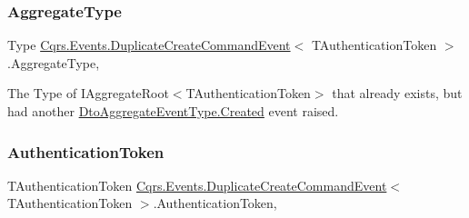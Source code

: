 \mbox{\label{classCqrs_1_1Events_1_1DuplicateCreateCommandEvent_ab08eddd7b1f812bdd62103017fd64f7e_ab08eddd7b1f812bdd62103017fd64f7e}} 
\subsubsection{\texorpdfstring{Aggregate\+Type}{AggregateType}}
{\footnotesize\ttfamily Type \hyperlink{classCqrs_1_1Events_1_1DuplicateCreateCommandEvent}{Cqrs.\+Events.\+Duplicate\+Create\+Command\+Event}$<$ T\+Authentication\+Token $>$.Aggregate\+Type\hspace{0.3cm}{\ttfamily [get]}, {\ttfamily [set]}}



The Type of I\+Aggregate\+Root$<$\+T\+Authentication\+Token$>$ that already exists, but had another \hyperlink{namespaceCqrs_1_1Events_a2a32e13adeac92f5a93966cd8ee2d39a_a2a32e13adeac92f5a93966cd8ee2d39aa0eceeb45861f9585dd7a97a3e36f85c6}{Dto\+Aggregate\+Event\+Type.\+Created} event raised. 

\mbox{\label{classCqrs_1_1Events_1_1DuplicateCreateCommandEvent_ab9737d0d029bb3f4b37d2a628ea98d04_ab9737d0d029bb3f4b37d2a628ea98d04}} 
\subsubsection{\texorpdfstring{Authentication\+Token}{AuthenticationToken}}
{\footnotesize\ttfamily T\+Authentication\+Token \hyperlink{classCqrs_1_1Events_1_1DuplicateCreateCommandEvent}{Cqrs.\+Events.\+Duplicate\+Create\+Command\+Event}$<$ T\+Authentication\+Token $>$.Authentication\+Token\hspace{0.3cm}{\ttfamily [get]}, {\ttfamily [set]}}




